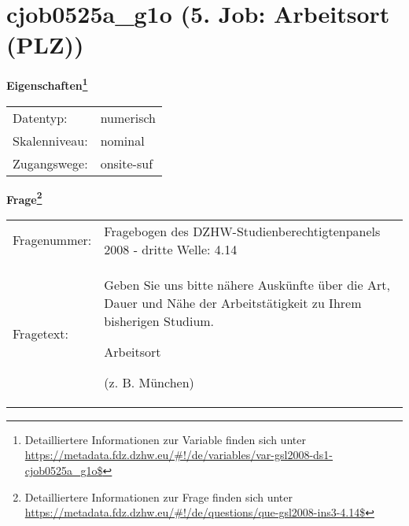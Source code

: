 
    \setcounter{footnote}{0}

    \vspace*{-1.8cm}
	\section{cjob0525a\_g1o (5. Job: Arbeitsort (PLZ))}
	\label{section:cjob0525a_g1o}



    \vspace*{0.5cm}
    \noindent\textbf{Eigenschaften\footnote{Detailliertere Informationen zur Variable finden sich unter
		\url{https://metadata.fdz.dzhw.eu/\#!/de/variables/var-gsl2008-ds1-cjob0525a_g1o$}}}\\
	\begin{tabularx}{\hsize}{@{}lX}
	Datentyp: & numerisch \\
	Skalenniveau: & nominal \\
	Zugangswege: &
	  onsite-suf
 \\
    \end{tabularx}



				\vspace*{0.5cm}
                \noindent\textbf{Frage\footnote{Detailliertere Informationen zur Frage finden sich unter
		              \url{https://metadata.fdz.dzhw.eu/\#!/de/questions/que-gsl2008-ins3-4.14$}}}\\
				\begin{tabularx}{\hsize}{@{}lX}
					Fragenummer: &
					  Fragebogen des DZHW-Studienberechtigtenpanels 2008 - dritte Welle:
					  4.14
 \\
					Fragetext: & Geben Sie uns bitte nähere Auskünfte über die Art, Dauer und Nähe der Arbeitstätigkeit zu Ihrem bisherigen Studium.\par  Arbeitsort\par  (z. B. München) \\
				\end{tabularx}





